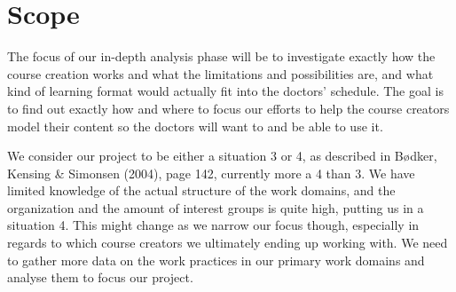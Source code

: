 \section{Scope}
The focus of our in-depth analysis phase will be to investigate exactly how the course creation works and what the limitations and possibilities are, and what kind of learning format would actually fit into the doctors’ schedule. The goal is to find out exactly how and where to focus our efforts to help the course creators model their content so the doctors will want to and be able to use it.

We consider our project to be either a situation 3 or 4, as described in Bødker, Kensing \& Simonsen (2004), page 142, currently more a 4 than 3. We have limited knowledge of the actual structure of the work domains, and the organization and the amount of interest groups is quite high, putting us in a situation 4. This might change as we narrow our focus though, especially in regards to which course creators we ultimately ending up working with.
We need to gather more data on the work practices in our primary work domains and analyse them to focus our project.
